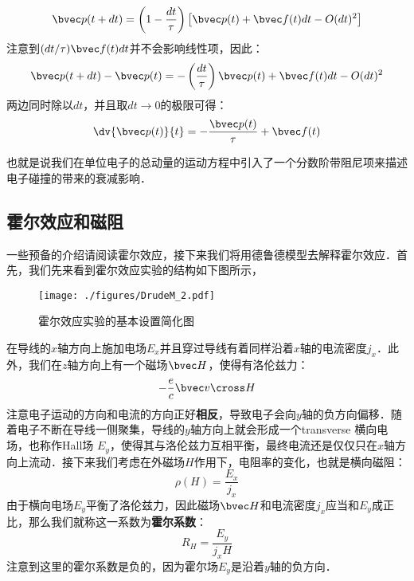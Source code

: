 \begin{equation}
\bvec p(t+dt)=\left(1-\frac{dt}{\tau}\right)\left[\bvec p(t)+\bvec f(t)dt - O(dt)^2\right]
\end{equation}
注意到$(dt/\tau)\bvec f(t)dt$并不会影响线性项，因此：
\begin{equation}
\bvec p(t+dt)-\bvec p(t)=-\left(\frac{dt}{\tau}\right)\bvec p(t)+\bvec f(t)dt - O(dt)^2
\end{equation}
两边同时除以$dt$，并且取$dt\rightarrow 0$的极限可得：
\begin{equation}\label{DrudeM_eq3}
\dv{\bvec p(t)}{t}= -\frac{\bvec p(t)}{\tau}+\bvec f(t)
\end{equation}

也就是说我们在单位电子的总动量的运动方程中引入了一个分数阶带阻尼项来描述电子碰撞的带来的衰减影响．
\subsection{霍尔效应和磁阻}
一些预备的介绍请阅读霍尔效应，接下来我们将用德鲁德模型去解释霍尔效应．首先，我们先来看到霍尔效应实验的结构如下图所示，
\begin{figure}[ht]
\centering
\texttt{[image: ./figures/DrudeM\_2.pdf]}
\caption{霍尔效应实验的基本设置简化图} \label{DrudeM_fig2}
\end{figure}
在导线的$x$轴方向上施加电场$E_x$并且穿过导线有着同样沿着$x$轴的电流密度$j_x$．此外，我们在$z$轴方向上有一个磁场$\bvec H$，使得有洛伦兹力：
\begin{equation}
-\frac{e}{c}\bvec v \cross H
\end{equation}
注意电子运动的方向和电流的方向正好\textbf{相反}，导致电子会向$y$轴的负方向偏移．随着电子不断在导线一侧聚集，导线的$y$轴方向上就会形成一个transverse 横向电场，也称作Hall场 $E_y$，使得其与洛伦兹力互相平衡，最终电流还是仅仅只在$x$轴方向上流动．接下来我们考虑在外磁场$H$作用下，电阻率的变化，也就是横向磁阻：
\begin{equation}
\rho(H)=\frac{E_x}{j_x}
\end{equation}
由于横向电场$E_y$平衡了洛伦兹力，因此磁场$\bvec H$和电流密度$j_x$应当和$E_y$成正比，那么我们就称这一系数为\textbf{霍尔系数}：
\begin{equation}\label{DrudeM_eq5}
R_H = \frac{E_y}{j_xH}
\end{equation}
注意到这里的霍尔系数是负的，因为霍尔场$E_y$是沿着$y$轴的负方向．

